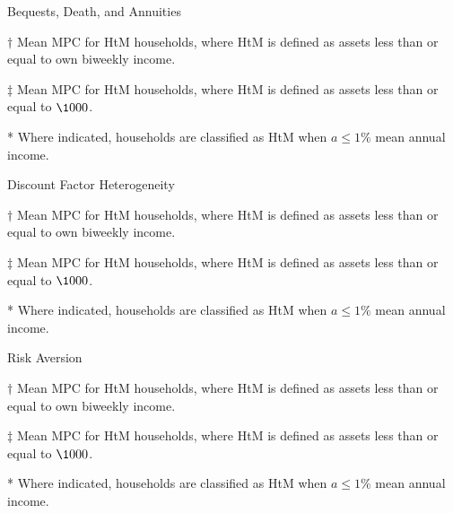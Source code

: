 \documentclass[9pt]{extarticle}
\begin{document}
\begin{table}[h]
\caption{Bequests, Death, and Annuities}
\begin{threeparttable}
\centering


\begin{tablenotes}
	\item[$\dagger$] Mean MPC for HtM households, where HtM is defined as assets less than or equal to own biweekly income.
	\item[$\ddagger$] Mean MPC for HtM households, where HtM is defined as assets less than or equal to $\1000$.
	\item[*] Where indicated, households are classified as HtM when $a \leq 1\%$ mean annual income.
\end{tablenotes}
\end{threeparttable}
\end{table}

\begin{table}[h]
\caption{Discount Factor Heterogeneity}
\begin{threeparttable}
\centering


\begin{tablenotes}
	\item[$\dagger$] Mean MPC for HtM households, where HtM is defined as assets less than or equal to own biweekly income.
	\item[$\ddagger$] Mean MPC for HtM households, where HtM is defined as assets less than or equal to $\1000$.
	\item[*] Where indicated, households are classified as HtM when $a \leq 1\%$ mean annual income.
\end{tablenotes}
\end{threeparttable}
\end{table}

\begin{table}[h]
\caption{Risk Aversion}
\begin{threeparttable}
\centering


\begin{tablenotes}
	\item[$\dagger$] Mean MPC for HtM households, where HtM is defined as assets less than or equal to own biweekly income.
	\item[$\ddagger$] Mean MPC for HtM households, where HtM is defined as assets less than or equal to $\1000$.
	\item[*] Where indicated, households are classified as HtM when $a \leq 1\%$ mean annual income.
\end{tablenotes}
\end{threeparttable}
\end{table}
\end{document}
